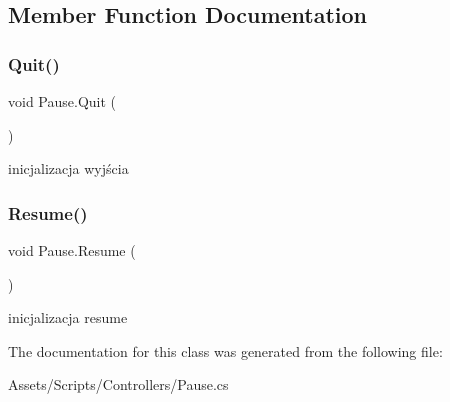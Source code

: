 \subsection{Member Function Documentation}
\mbox{\label{class_pause_a5371367a048d854eba46cf8e2d746776}} 
\subsubsection{\texorpdfstring{Quit()}{Quit()}}
{\footnotesize\ttfamily void Pause.\+Quit (\begin{DoxyParamCaption}{ }\end{DoxyParamCaption})}



inicjalizacja wyjścia 

\mbox{\label{class_pause_a1d1652c23fb2bab829e6d3f7e76727ec}} 
\subsubsection{\texorpdfstring{Resume()}{Resume()}}
{\footnotesize\ttfamily void Pause.\+Resume (\begin{DoxyParamCaption}{ }\end{DoxyParamCaption})}



inicjalizacja resume 



The documentation for this class was generated from the following file\+:\begin{DoxyCompactItemize}
\item 
Assets/\+Scripts/\+Controllers/Pause.\+cs\end{DoxyCompactItemize}
